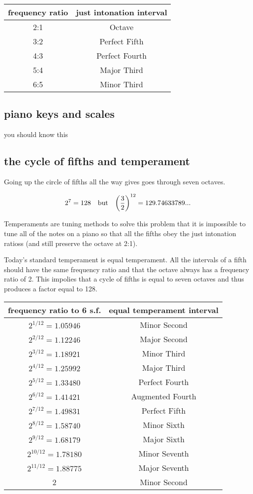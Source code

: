 \documentclass[10pt, a4paper, twocolumn]{article}
\begin{document}
\begin{tabular}{|c|c|}
\hline frequency ratio & just intonation interval
\\ \hline 2:1 & Octave
\\ \hline 3:2 & Perfect Fifth
\\ \hline 4:3 & Perfect Fourth
\\ \hline 5:4 & Major Third
\\ \hline 6:5 & Minor Third \\ \hline
\end{tabular}

\subsection{piano keys and scales} you should know this
\subsection{the cycle of fifths and temperament}
Going up the circle of fifths all the way gives goes through seven octaves.

\[2^7=128 \qq{but} \qty(\frac32)^{12}=129.74633789...\]

Temperaments are tuning methods to solve this problem that it is impossible to tune all of the notes on a piano so that all the fifths obey the just intonation ratioss (and still preserve the octave at 2:1).

Today's standard temperament is equal temperament. All the intervals of a fifth should have the same frequency ratio and that the octave always has a frequency ratio of 2. This impolies that a cycle of fifths is equal to seven octaves and thus produces a factor equal to 128.

\begin{tabular}{|c|c|}
\hline
frequency ratio to 6 s.f. & equal temperament interval
\\ \hline $2^{1/12}=1.05946$& Minor Second
\\ \hline $2^{2/12}=1.12246$& Major Second
\\ \hline $2^{3/12}=1.18921$& Minor Third
\\ \hline $2^{4/12}=1.25992$& Major Third
\\ \hline $2^{5/12}=1.33480$& Perfect Fourth
\\ \hline $2^{6/12}=1.41421$& Augmented Fourth
\\ \hline $2^{7/12}=1.49831$& Perfect Fifth
\\ \hline $2^{8/12}=1.58740$& Minor Sixth
\\ \hline $2^{9/12}=1.68179$& Major Sixth
\\ \hline $2^{10/12}=1.78180$& Minor Seventh
\\ \hline $2^{11/12}=1.88775$& Major Seventh
\\ \hline 2 & Minor Second \\ \hline
\end{tabular}
\end{document}
